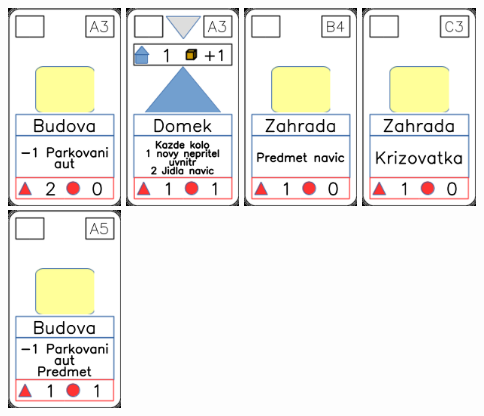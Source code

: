 \documentclass[a4paper]{article}
\begin{document}
	\includegraphics[width=3.0cm]{img-2_2}
	\includegraphics[width=3.0cm]{img-3_2}
	\includegraphics[width=3.0cm]{img-2_23}
	\includegraphics[width=3.0cm]{img-2_27}
	\includegraphics[width=3.0cm]{img-2_4}
\end{document}
